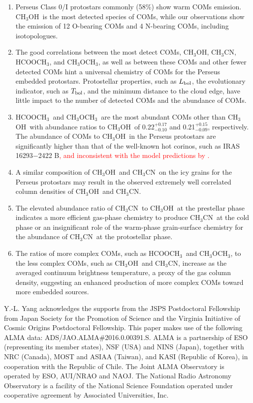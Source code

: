 \documentclass[twocolumn]{aastex62}
\newcommand{\lbol}{\mbox{$L_{\rm bol}$}}
\newcommand{\tbol}{\mbox{$T_{\rm bol}$}}
\newcommand{\methylformate}{\mbox{HCOOCH$_{3}$}}
\newcommand{\methanol}{\mbox{CH$_{3}$OH}}
\newcommand{\dimethylether}{\mbox{CH$_{3}$OCH$_{3}$}}
\newcommand{\methylcyanide}{\mbox{CH$_{3}$CN}}
\begin{document}
\begin{enumerate}
  \item Perseus Class 0/I protostars commonly (58\%) show warm COMs emission.  \methanol\ is the most detected species of COMs, while our observations show the emission of 12 O-bearing COMs and 4 N-bearing COMs, including isotopologues.
  \item The good correlations between the most detect COMs, \methanol, \methylcyanide, \methylformate, and \dimethylether, as well as between these COMs and other fewer detected COMs hint a universal chemistry of COMs for the Perseus embedded protostars.  Protostellar properties, such as \lbol, the evolutionary indicator, such as \tbol, and the minimum distance to the cloud edge, have little impact to the number of detected COMs and the abundance of COMs.
  \item \methylformate\ and \dimethylether\ are the most abundant COMs other than \methanol\ with abundance ratios to \methanol\ of 0.22$^{+0.17}_{-0.10}$ and 0.21$^{+0.15}_{-0.09}$, respectively.  The abundance of COMs to \methanol\ in the Perseus protostars are significantly higher than that of the well-known hot corinos, such as IRAS 16293$-$2422 B\textcolor{red}{, and inconsistent with the model predictions by \citet{2013ApJ...765...60G}.}
  \item A similar composition of \methanol\ and \methylcyanide\ on the icy grains for the Perseus protostars may result in the observed extremely well correlated column densities of \methanol\ and \methylcyanide.  
  \item The elevated abundance ratio of \methylcyanide\ to \methanol\ at the prestellar phase indicates a more efficient gas-phase chemistry to produce \methylcyanide\ at the cold phase or an insignificant role of the warm-phase grain-surface chemistry for the abundance of \methylcyanide\ at the protostellar phase.
  \item The ratios of more complex COMs, such as \methylformate\ and \dimethylether, to the less complex COMs, such as \methanol\ and \methylcyanide, increase as the averaged continuum brightness temperature, a proxy of the gas column density, suggesting an enhanced production of more complex COMs toward more embedded sources.
\end{enumerate}

\acknowledgements
Y.-L. Yang acknowledges the supports from the JSPS Postdoctoral Fellowship from Japan Society for the Promotion of Science and the Virginia Initiative of Cosmic Origins Postdoctoral Fellowship.  This paper makes use of the following ALMA data: ADS/JAO.ALMA\#2016.0.00391.S. ALMA is a partnership of ESO (representing its member states), NSF (USA) and NINS (Japan), together with NRC (Canada), MOST and ASIAA (Taiwan), and KASI (Republic of Korea), in cooperation with the Republic of Chile. The Joint ALMA Observatory is operated by ESO, AUI/NRAO and NAOJ.  The National Radio Astronomy Observatory is a facility of the National Science Foundation operated under cooperative agreement by Associated Universities, Inc.
\end{document}
